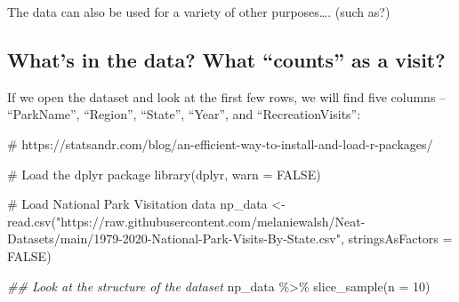 \documentclass[
  letterpaper,
  DIV=11,
  numbers=noendperiod]{scrartcl}
\newenvironment{Shaded}{\begin{snugshade}}{\end{snugshade}}
\newcommand{\AttributeTok}[1]{\textcolor[rgb]{0.40,0.45,0.13}{#1}}
\newcommand{\CommentTok}[1]{\textcolor[rgb]{0.37,0.37,0.37}{#1}}
\newcommand{\ConstantTok}[1]{\textcolor[rgb]{0.56,0.35,0.01}{#1}}
\newcommand{\DecValTok}[1]{\textcolor[rgb]{0.68,0.00,0.00}{#1}}
\newcommand{\DocumentationTok}[1]{\textcolor[rgb]{0.37,0.37,0.37}{\textit{#1}}}
\newcommand{\FunctionTok}[1]{\textcolor[rgb]{0.28,0.35,0.67}{#1}}
\newcommand{\NormalTok}[1]{\textcolor[rgb]{0.00,0.23,0.31}{#1}}
\newcommand{\OtherTok}[1]{\textcolor[rgb]{0.00,0.23,0.31}{#1}}
\newcommand{\SpecialCharTok}[1]{\textcolor[rgb]{0.37,0.37,0.37}{#1}}
\newcommand{\StringTok}[1]{\textcolor[rgb]{0.13,0.47,0.30}{#1}}
\begin{document}
The data can also be used for a variety of other purposes\ldots. (such
as?)

\subsection{What's in the data? What ``counts'' as a
visit?}\label{whats-in-the-data-what-counts-as-a-visit}

If we open the dataset and look at the first few rows, we will find five
columns -- ``ParkName'', ``Region'', ``State'', ``Year'', and
``RecreationVisits'':

\begin{Shaded}
\begin{Highlighting}[]
\CommentTok{\# https://statsandr.com/blog/an{-}efficient{-}way{-}to{-}install{-}and{-}load{-}r{-}packages/}

\CommentTok{\# Load the dplyr package}
\FunctionTok{library}\NormalTok{(dplyr, }\AttributeTok{warn =} \ConstantTok{FALSE}\NormalTok{)}

\CommentTok{\# Load National Park Visitation data}
\NormalTok{np\_data }\OtherTok{\textless{}{-}} \FunctionTok{read.csv}\NormalTok{(}\StringTok{"https://raw.githubusercontent.com/melaniewalsh/Neat{-}Datasets/main/1979{-}2020{-}National{-}Park{-}Visits{-}By{-}State.csv"}\NormalTok{, }\AttributeTok{stringsAsFactors =} \ConstantTok{FALSE}\NormalTok{)}

\DocumentationTok{\#\# Look at the structure of the dataset}
\NormalTok{np\_data }\SpecialCharTok{\%\textgreater{}\%} \FunctionTok{slice\_sample}\NormalTok{(}\AttributeTok{n =} \DecValTok{10}\NormalTok{)}
\end{Highlighting}
\end{Shaded}
\end{document}
